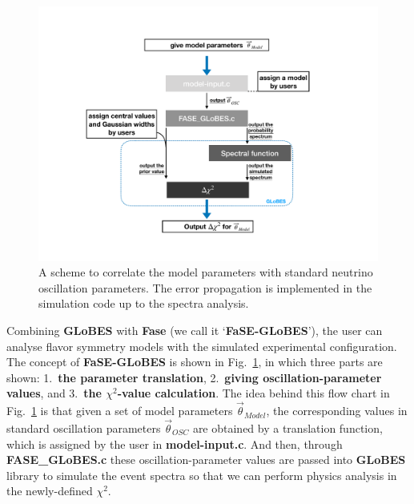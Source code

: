 \documentclass[aps,prd,nofootinbib,preprint]{revtex4}
\begin{document}
\begin{figure}[!h]%
\centering
\includegraphics[width=7in]{Figs/FASE-chart_1_2.pdf}
\caption{A scheme to correlate the model parameters with standard neutrino oscillation parameters. The error propagation is implemented in the simulation code up to the spectra analysis.}%
\label{fig:FASE}
\end{figure}

{\color{blue}Combining \textbf{GLoBES} with \textbf{Fase} (we call it `\textbf{FaSE-GLoBES}'),  the user can analyse flavor symmetry models with the simulated experimental configuration.} The concept of \textbf{FaSE-GLoBES} is shown in Fig.~\ref{fig:FASE}, in which three parts are shown: 1.~\textbf{the parameter translation}, 2.~\textbf{giving oscillation-parameter values}, and 3.~\textbf{the $\chi^2$-value calculation}. 
%
The idea behind this flow chart in Fig.~\ref{fig:FASE} is that given a set of model parameters $\vec{\theta}_{Model}$, the corresponding values in standard oscillation parameters $\vec{\theta}_{OSC}$ are obtained by a translation function, which is assigned by the user in \textbf{model-input.c}. And then, through \textbf{FASE\_GLoBES.c} these oscillation-parameter values are passed into \textbf{GLoBES} library to simulate the event spectra so that we can perform physics analysis in the newly-defined $\chi^2$. 
\end{document}
